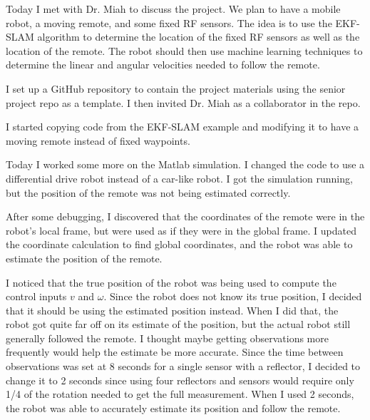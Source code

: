 \documentclass[fontsize=11pt, %
                             paper=letter, %
                             openany, %
                             captions=tableheading,
                             index=totoc,
                             hyperref]{labbook}
\begin{document}
\begin{addmargin}[0cm]{0cm} %

\pagestyle{scrheadings} %



Today I met with Dr. Miah to discuss the project. We plan to have a mobile robot, a moving remote, and some fixed RF sensors. The idea is to use the EKF-SLAM algorithm to determine the location of the fixed RF sensors as well as the location of the remote. The robot should then use machine learning techniques to determine the linear and angular velocities needed to follow the remote.

\vspace{12pt}
I set up a GitHub repository to contain the project materials using the senior project repo as a template. I then invited Dr. Miah as a collaborator in the repo.

I started copying code from the EKF-SLAM example and modifying it to have a moving remote instead of fixed waypoints.
%


Today I worked some more on the Matlab simulation. I changed the code to use a differential drive robot instead of a car-like robot. I got the simulation running, but the position of the remote was not being estimated correctly.

\vspace{12pt}
After some debugging, I discovered that the coordinates of the remote were in the robot's local frame, but were used as if they were in the global frame. I updated the coordinate calculation to find global coordinates, and the robot was able to estimate the position of the remote.

\vspace{12pt}
I noticed that the true position of the robot was being used to compute the control inputs $v$ and $\omega$. Since the robot does not know its true position, I decided that it should be using the estimated position instead. When I did that, the robot got quite far off on its estimate of the position, but the actual robot still generally followed the remote. I thought maybe getting observations more frequently would help the estimate be more accurate. Since the time between observations was set at 8 seconds for a single sensor with a reflector, I decided to change it to 2 seconds since using four reflectors and sensors would require only 1/4 of the rotation needed to get the full measurement. When I used 2 seconds, the robot was able to accurately estimate its position and follow the remote.


\end{addmargin}
\end{document}
